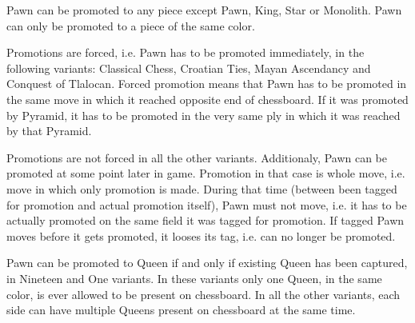 Pawn can be promoted to any piece except Pawn, King, Star or Monolith.
Pawn can only be promoted to a piece of the same color.

Promotions are forced, i.e. Pawn has to be promoted immediately, in the following
variants: Classical Chess, Croatian Ties, Mayan Ascendancy and Conquest of Tlalocan.
Forced promotion means that Pawn has to be promoted in the same move in which it
reached opposite end of chessboard. If it was promoted by Pyramid, it has to be
promoted in the very same ply in which it was reached by that Pyramid.

Promotions are not forced in all the other variants. Additionaly, Pawn can be promoted
at some point later in game. Promotion in that case is whole move, i.e. move in which
only promotion is made. During that time (between been tagged for promotion and actual
promotion itself), Pawn must not move, i.e. it has to be actually promoted on the same
field it was tagged for promotion. If tagged Pawn moves before it gets promoted, it
looses its tag, i.e. can no longer be promoted.

Pawn can be promoted to Queen if and only if existing Queen has been captured, in
Nineteen and One variants. In these variants only one Queen, in the same color, is
ever allowed to be present on chessboard. In all the other variants, each side can
have multiple Queens present on chessboard at the same time.







\clearpage %
